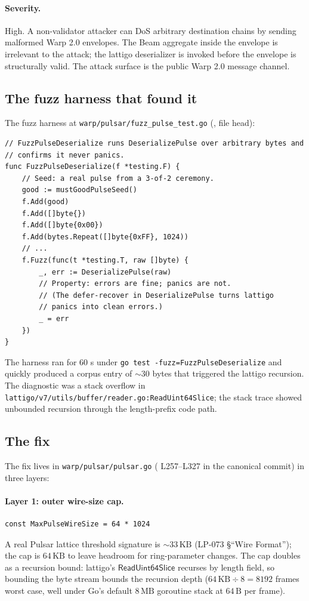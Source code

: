 \paragraph{Severity.} High. A non-validator attacker can DoS arbitrary destination chains by sending malformed Warp 2.0 envelopes. The Beam aggregate inside the envelope is irrelevant to the attack; the lattigo deserializer is invoked before the envelope is structurally valid. The attack surface is the public Warp 2.0 message channel.

\subsection{The fuzz harness that found it}

The fuzz harness at \texttt{warp/pulsar/fuzz\_pulse\_test.go} (\cite{warpgo}, file head):

\begin{verbatim}
// FuzzPulseDeserialize runs DeserializePulse over arbitrary bytes and
// confirms it never panics.
func FuzzPulseDeserialize(f *testing.F) {
    // Seed: a real pulse from a 3-of-2 ceremony.
    good := mustGoodPulseSeed()
    f.Add(good)
    f.Add([]byte{})
    f.Add([]byte{0x00})
    f.Add(bytes.Repeat([]byte{0xFF}, 1024))
    // ...
    f.Fuzz(func(t *testing.T, raw []byte) {
        _, err := DeserializePulse(raw)
        // Property: errors are fine; panics are not.
        // (The defer-recover in DeserializePulse turns lattigo
        // panics into clean errors.)
        _ = err
    })
}
\end{verbatim}

The harness ran for 60 s under \texttt{go test -fuzz=FuzzPulseDeserialize} and quickly produced a corpus entry of $\sim 30$ bytes that triggered the lattigo recursion. The diagnostic was a stack overflow in \texttt{lattigo/v7/utils/buffer/reader.go:ReadUint64Slice}; the stack trace showed unbounded recursion through the length-prefix code path.

\subsection{The fix}

The fix lives in \texttt{warp/pulsar/pulsar.go} (\cite{warpgo} L257--L327 in the canonical commit) in three layers:

\paragraph{Layer 1: outer wire-size cap.}
\begin{verbatim}
const MaxPulseWireSize = 64 * 1024
\end{verbatim}
A real Pulsar lattice threshold signature is $\sim 33\,\mathrm{KB}$ (LP-073 \cite{lp073} \S``Wire Format''); the cap is $64\,\mathrm{KB}$ to leave headroom for ring-parameter changes. The cap doubles as a recursion bound: lattigo's $\mathsf{ReadUint64Slice}$ recurses by length field, so bounding the byte stream bounds the recursion depth ($64\,\mathrm{KB} \div 8 = 8192$ frames worst case, well under Go's default $8\,\mathrm{MB}$ goroutine stack at $64\,\mathrm{B}$ per frame).


